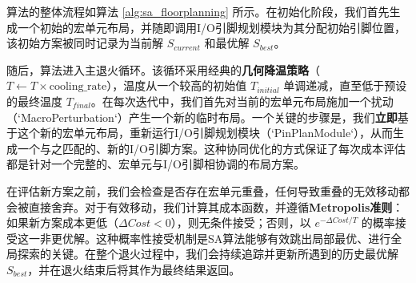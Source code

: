 \documentclass[conference]{IEEEtran}
\begin{document}
算法的整体流程如算法 \ref{alg:sa_floorplanning} 所示。在初始化阶段，我们首先生成一个初始的宏单元布局，并随即调用I/O引脚规划模块为其分配初始引脚位置，该初始方案被同时记录为当前解 $S_{current}$ 和最优解 $S_{best}$。

随后，算法进入主退火循环。该循环采用经典的\textbf{几何降温策略}（$T \gets T \times \text{cooling\_rate}$），温度从一个较高的初始值 $T_{initial}$ 单调递减，直至低于预设的最终温度 $T_{final}$。在每次迭代中，我们首先对当前的宏单元布局施加一个扰动（`MacroPerturbation`）产生一个新的临时布局。一个关键的步骤是，我们\textbf{立即}基于这个新的宏单元布局，重新运行I/O引脚规划模块（`PinPlanModule`），从而生成一个与之匹配的、新的I/O引脚方案。这种协同优化的方式保证了每次成本评估都是针对一个完整的、宏单元与I/O引脚相协调的布局方案。

在评估新方案之前，我们会检查是否存在宏单元重叠，任何导致重叠的无效移动都会被直接舍弃。对于有效移动，我们计算其成本函数，并遵循\textbf{Metropolis准则}：如果新方案成本更低（$\Delta Cost < 0$），则无条件接受；否则，以 $e^{-\Delta Cost/T}$ 的概率接受这一非更优解。这种概率性接受机制是SA算法能够有效跳出局部最优、进行全局探索的关键。在整个退火过程中，我们会持续追踪并更新所遇到的历史最优解 $S_{best}$，并在退火结束后将其作为最终结果返回。
\end{document}

